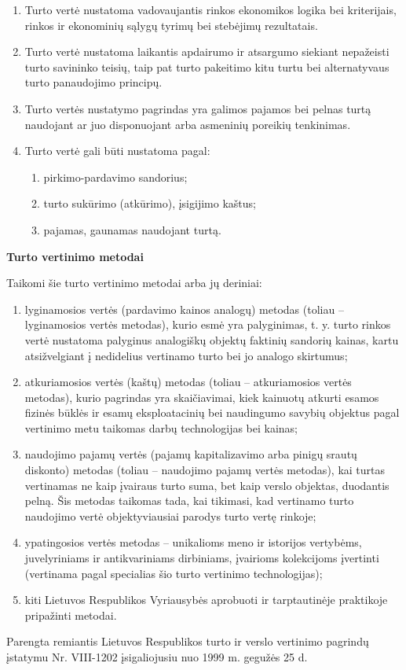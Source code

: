 \begin{enumerate}
    \item Turto vertė nustatoma vadovaujantis rinkos ekonomikos logika bei kriterijais, rinkos ir ekonominių sąlygų tyrimų bei stebėjimų rezultatais.
    \item Turto vertė nustatoma laikantis apdairumo ir atsargumo siekiant nepažeisti turto savininko teisių, taip pat turto pakeitimo kitu turtu bei alternatyvaus turto panaudojimo principų.
    \item Turto vertės nustatymo pagrindas yra galimos pajamos bei pelnas turtą naudojant ar juo disponuojant arba asmeninių poreikių tenkinimas.
    \item Turto vertė gali būti nustatoma pagal:
    \begin{enumerate}
        \item pirkimo-pardavimo sandorius;
        \item turto sukūrimo (atkūrimo), įsigijimo kaštus;
        \item pajamas, gaunamas naudojant turtą.
    \end{enumerate}
\end{enumerate}



\textbf{Turto vertinimo metodai}

Taikomi šie turto vertinimo metodai arba jų deriniai:

\begin{enumerate}
    \item lyginamosios vertės (pardavimo kainos analogų) metodas (toliau – lyginamosios vertės metodas), kurio esmė yra palyginimas, t. y. turto rinkos vertė nustatoma palyginus analogiškų objektų faktinių sandorių kainas, kartu atsižvelgiant į nedidelius vertinamo turto bei jo analogo skirtumus;
    \item atkuriamosios vertės (kaštų) metodas (toliau – atkuriamosios vertės metodas), kurio pagrindas yra skaičiavimai, kiek kainuotų atkurti esamos fizinės būklės ir esamų eksploatacinių bei naudingumo savybių objektus pagal vertinimo metu taikomas darbų technologijas bei kainas;
    \item naudojimo pajamų vertės (pajamų kapitalizavimo arba pinigų srautų diskonto) metodas (toliau – naudojimo pajamų vertės metodas), kai turtas vertinamas ne kaip įvairaus turto suma, bet kaip verslo objektas, duodantis pelną. Šis metodas taikomas tada, kai tikimasi, kad vertinamo turto naudojimo vertė objektyviausiai parodys turto vertę rinkoje;
    \item ypatingosios vertės metodas – unikalioms meno ir istorijos vertybėms, juvelyriniams ir antikvariniams dirbiniams, įvairioms kolekcijoms įvertinti (vertinama pagal specialias šio turto vertinimo technologijas);
    \item kiti Lietuvos Respublikos Vyriausybės aprobuoti ir tarptautinėje praktikoje pripažinti metodai.
\end{enumerate}

Parengta remiantis Lietuvos Respublikos turto ir verslo vertinimo pagrindų įstatymu Nr. VIII-1202 įsigaliojusiu nuo 1999 m. gegužės 25 d.

\pagebreak